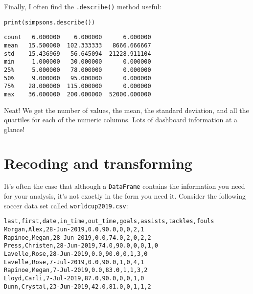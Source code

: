 Finally, I often find the \texttt{.describe()} method useful:

\begin{samepage}
\begin{Verbatim}[fontsize=\small,samepage=true,frame=single,framesep=3mm]
print(simpsons.describe())
\end{Verbatim}
\vspace{-.2in}

\begin{Verbatim}[fontsize=\small,samepage=true,frame=leftline,framesep=5mm,framerule=1mm]
count   6.000000    6.000000      6.000000
mean   15.500000  102.333333   8666.666667
std    15.436969   56.645094  21228.911104
min     1.000000   30.000000      0.000000
25%     5.000000   78.000000      0.000000
50%     9.000000   95.000000      0.000000
75%    28.000000  115.000000      0.000000
max    36.000000  200.000000  52000.000000
\end{Verbatim}
\end{samepage}


Neat! We get the number of values, the mean, the standard deviation, and all
the quartiles for each of the numeric columns. Lots of dashboard information at
a glance!

\section{Recoding and transforming}


It's often the case that although a \texttt{DataFrame} contains the information
you need for your analysis, it's not exactly in the form you need it. Consider
the following soccer data set called \texttt{worldcup2019.csv}:

\begin{Verbatim}[fontsize=\small,samepage=true,frame=lines,framesep=3mm]
last,first,date,in_time,out_time,goals,assists,tackles,fouls
Morgan,Alex,28-Jun-2019,0.0,90.0,0,0,2,1
Rapinoe,Megan,28-Jun-2019,0.0,74.0,2,0,2,2
Press,Christen,28-Jun-2019,74.0,90.0,0,0,1,0
Lavelle,Rose,28-Jun-2019,0.0,90.0,0,1,3,0
Lavelle,Rose,7-Jul-2019,0.0,90.0,1,0,4,1
Rapinoe,Megan,7-Jul-2019,0.0,83.0,1,1,3,2
Lloyd,Carli,7-Jul-2019,87.0,90.0,0,0,1,0
Dunn,Crystal,23-Jun-2019,42.0,81.0,0,1,1,2
\end{Verbatim}


